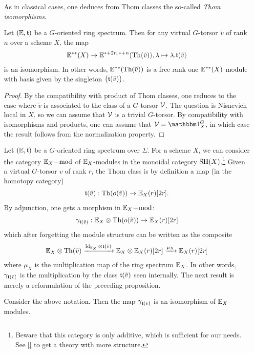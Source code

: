 As in classical cases, one deduces from Thom classes the so-called \emph{Thom isomorphisms}.
\begin{prop}
Let $(\mathbb E,\mathfrak{t})$ be a $G$-oriented ring spectrum.
Then for any virtual $G$-torsor $\tilde v$ of rank $n$ over a scheme $X$, the map
$$
\mathbb E^{**}(X) \rightarrow \mathbb E^{*+2n,*+n}(\operatorname{Th}(\tilde v)), \lambda \mapsto \lambda.\mathfrak{t}(\tilde v)
$$
is an isomorphism. In other words, $\mathbb E^{**}(\operatorname{Th}(\tilde v))$ is a free rank one $\mathbb E^{**}(X)$-module
with basis given by the singleton $\big(\mathfrak{t}(\tilde v)\big)$.
\end{prop}
\begin{proof}
By the compatibility with product of Thom classes, one reduces to the case where
$\tilde v$ is associated to the class of a $G$-torsor $\mathcal V$. The question is Nisnevich local
in $X$, so we can assume that $\mathcal V$ is a trivial $G$-torsor. By compatibility with isomorphisms
and products, one can assume that $\cV=\un_X^G$, in which case the result follows
from the normalization property. 
\end{proof}

\begin{num}\label{num:E-modules}
Let $(\mathbb E,\mathfrak{t})$ be a $G$-oriented ring spectrum over $\Sigma$.
For a scheme $X$, we can consider the category $\mathbb E_X\!-\!\operatorname{mod}$ of $\mathbb E_X$-modules
in the monoidal category $\operatorname{SH}(X)$.\footnote{Beware that this category is only additive, which is sufficient for our needs. See \ref{} to get a theory with more structure.}
Given a virtual $G$-torsor $v$ of rank $r$,
the Thom class is by definition a map (in the homotopy category)
$$
\mathfrak{t}(\tilde v):\operatorname{Th}(o(\tilde v)) \rightarrow \mathbb E_X(r)[2r].
$$
By adjunction, one gets a morphism in $\mathbb E_X\!-\!\operatorname{mod}$:
$$
\gamma_{\mathfrak{t}(\tilde v)}:\mathbb E_X \otimes \operatorname{Th}(o(\tilde v)) \rightarrow \mathbb E_X(r)[2r]
$$
which after forgetting the module structure can be written as the composite
\begin{equation}\label{eq:thomclass}
\mathbb E_X \otimes \operatorname{Th}(\tilde v) \xrightarrow{\operatorname{Id}_{\mathbb E_X} \otimes \mathfrak{t}(\tilde v)} \mathbb E_X \otimes \mathbb E_X(r)[2r]
\xrightarrow{\mu_X} \mathbb E_X(r)[2r]
\end{equation}
where $\mu_X$ is the multiplication map of the ring spectrum $\mathbb E_X$. In other words,
$\gamma_{\mathfrak{t}(\tilde v)}$ is the multiplication by the class $\mathfrak{t}(\tilde v)$ seen internally.
The next result is merely a reformulation of the preceding proposition.
\end{num}
\begin{cor}\label{cor:stable-thom}
Consider the above notation. Then the map $\gamma_{\mathfrak{t}(v)}$ is an isomorphism
of $\mathbb E_X$-modules.
\end{cor}

